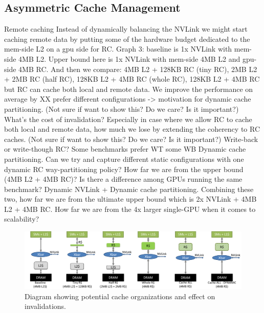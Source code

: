 \subsection{Asymmetric Cache Management}
\label{caching}
Remote caching
Instead of dynamically balancing the NVLink we might start caching remote data 
by putting some of the hardware budget dedicated to the mem-side L2 on a gpu 
side for RC. 
Graph 3: baseline is 1x NVLink with mem-side 4MB L2. Upper bound here is 1x 
NVLink with mem-side 4MB L2 and gpu-side 4MB RC. And then we compare: 4MB L2 + 
128KB RC (tiny RC), 2MB L2 + 2MB RC (half RC), 128KB L2 + 4MB RC (whole RC), 
128KB L2 + 4MB RC but RC can cache both local and remote data. We improve the 
performance on average by XX%
prefer different configurations -> motivation for dynamic cache partitioning. 
(Not sure if want to show this? Do we care? Is it important?) What’s the cost of 
invalidation? Especially in case where we allow RC to cache both local and 
remote data, how much we lose by extending the coherency to RC caches. 
(Not sure if want to show this? Do we care? Is it important?) Write-back or 
write-though RC? Some benchmarks prefer WT some WB
Dynamic cache partitioning. Can we try and capture different static 
configurations with one dynamic RC way-partitioning policy? How far we are from 
the upper bound (4MB L2 + 4MB RC)? Is there a difference among GPUs running the 
same benchmark? 
Dynamic NVLink + Dynamic cache partitioning. Combining these two, how far we are 
from the ultimate upper bound which is 2x NVLink + 4MB L2 + 4MB RC. How far we 
are from the 4x larger single-GPU when it comes to scalability?

\begin{figure}[t]
    \centering
    \includegraphics[width=1.0\textwidth]{figures/cache_configurations.pdf}
    \caption{Diagram showing potential cache organizations and effect on 
invalidations.}
    \label{fig:cacheorg}
\end{figure}



